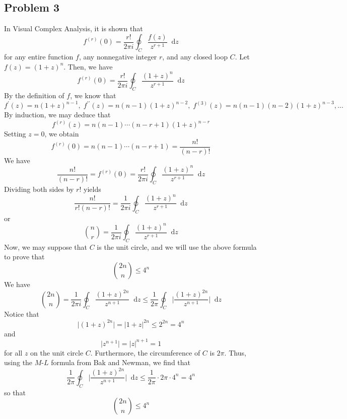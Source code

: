 \documentclass[12pt]{article}
\newcommand*\diff{\mathop{}\!\mathrm{d}}
\begin{document}
\subsection*{Problem 3}
In Visual Complex Analysis, it is shown that
\[
f^{(r)}(0) = \frac{r!}{2\pi i} \oint_C \frac{f(z)}{z^{r+1}} \diff z
\] for any entire function $f$, any nonnegative integer $r$, and any closed loop $C$. Let $f(z) = (1+z)^n$. Then, we have
\[
f^{(r)}(0) = \frac{r!}{2\pi i} \oint_C \frac{(1+z)^n}{z^{r+1}} \diff z
\] By the definition of $f$, we know that
\[
f^\prime(z) = n(1+z)^{n-1}, \; f^{\prime\prime}(z) = n(n-1)(1+z)^{n-2}, \; f^{(3)}(z) = n(n-1)(n-2)(1+z)^{n-3},\ldots
\] By induction, we may deduce that
\[
f^{(r)}(z) = n(n-1)\cdots(n-r+1) (1+z)^{n-r}
\] Setting $z = 0$, we obtain
\[
f^{(r)}(0) = n(n-1)\cdots(n-r+1) = \frac{n!}{(n-r)!}
\] We have
\[
\frac{n!}{(n-r)!} = f^{(r)}(0) = \frac{r!}{2\pi i} \oint_C \frac{(1+z)^n}{z^{r+1}} \diff z
\] Dividing both sides by $r!$ yields
\[
\frac{n!}{r!(n-r)!} = \frac{1}{2\pi i} \oint_C \frac{(1+z)^n}{z^{r+1}} \diff z
\] or
\[
\binom{n}{r} = \frac{1}{2\pi i} \oint_C \frac{(1+z)^n}{z^{r+1}} \diff z
\] Now, we may suppose that $C$ is the unit circle, and we will use the above formula to prove that
\[
\binom{2n}{n} \leq 4^n
\] We have
\[
\binom{2n}{n} = \frac{1}{2\pi i} \oint_C \frac{(1+z)^{2n}}{z^{n+1}} \diff z \leq \frac{1}{2\pi} \oint_C \bigg \vert \frac{(1+z)^{2n}}{z^{n+1}} \bigg \vert \diff z 
\] Notice that
\[
\vert (1+z)^{2n} \vert = \vert 1+z \vert^{2n} \leq 2^{2n} = 4^n
\] and
\[
\vert z^{n+1} \vert = \vert z \vert^{n+1} = 1
\] for all $z$ on the unit circle $C$. Furthermore, the circumference of $C$ is $2\pi$. Thus, using the $M$-$L$ formula from Bak and Newman, we find that
\[
\frac{1}{2\pi} \oint_C \bigg \vert \frac{(1+z)^{2n}}{z^{n+1}} \bigg \vert \diff z \leq \frac{1}{2\pi} \cdot 2\pi \cdot 4^n = 4^n
\] so that
\[
\binom{2n}{n} \leq 4^n
\]
\end{document}
